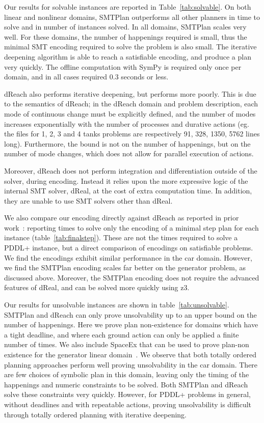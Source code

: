 Our results for solvable instances are reported in Table~\ref{tab:solvable}. On both linear and nonlinear domains, SMTPlan outperforms all other planners in time to solve and in number of instances solved. In all domains, SMTPlan scales very well. For these domains, the number of happenings required is small, thus the minimal SMT encoding required to solve the problem is also small. The iterative deepening algorithm is able to reach a satisfiable encoding, and produce a plan very quickly. The offline computation with SymPy is required only once per domain, and in all cases required 0.3 seconds or less.

dReach also performs iterative deepening, but performs more poorly. This is due to the semantics of dReach; in the dReach domain and problem description, each mode of continuous change must be explicitly defined, and the number of modes increases exponentially with the number of processes and durative actions (eg. the files for 1, 2, 3 and 4 tanks problems are respectively 91, 328, 1350, 5762 lines long). Furthermore, the bound is not on the number of happenings, but on the number of mode changes, which does not allow for parallel execution of actions.

Moreover, dReach does not perform integration and differentiation outside of the solver, during encoding. Instead it relies upon the more expressive logic of the internal SMT solver, dReal, at the cost of extra computation time. In addition, they are unable to use SMT solvers other than dReal.

We also compare our encoding directly against dReach as reported in prior work~\cite{bryce}: reporting times to solve only the encoding of a minimal step plan for each instance (table~\ref{tab:finalstep}). These are not the times required to solve a PDDL+ instance, but a direct comparison of encodings on satisfiable problems. We find the encodings exhibit similar performance in the car domain. However, we find the SMTPlan encoding scales far better on the generator problem, as discussed above. Moreover, the SMTPlan encoding does not require the advanced features of dReal, and can be solved more quickly using z3.

Our results for unsolvable instances are shown in table~\ref{tab:unsolvable}. SMTPlan and dReach can only prove unsolvability up to an upper bound on the number of happenings. Here we prove plan non-existence for domains which have a tight deadline, and where each ground action can only be applied a finite number of times. We also include SpaceEx that can be used to prove plan-non existence for the generator linear domain~\cite{bogomolov14}. We observe that both totally ordered planning approaches perform well proving unsolvability in the car domain. There are few choices of symbolic plan in this domain, leaving only the timing of the happenings and numeric constraints to be solved. Both SMTPlan and dReach solve these constraints very quickly. However, for PDDL+ problems in general, without deadlines and with repeatable actions, proving unsolvability is difficult through totally ordered planning with iterative deepening.

